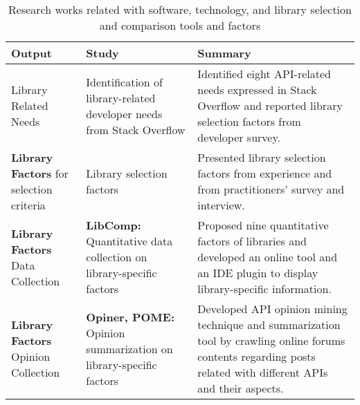 \begin{table*}[]
    \centering
    \caption{Research works related with software, technology, and library selection and comparison tools and factors} 
    \renewcommand{\arraystretch}{1.2}
    
    \begin{tabular}{>{\raggedright}p{2.6cm}p{3.9cm}p{7.6cm}}
    \toprule
    \textbf{Output} & \textbf{Study} & \textbf{Summary}  \\ 
    \midrule
    
    Library Related Needs & 
    Identification of library-related developer needs from Stack Overflow \cite{liu2021api, uddin2019understanding} 
    & Identified eight API-related needs expressed in Stack Overflow and reported library selection factors from developer survey. \\ 
    
    
    \textbf{Library Factors} for selection criteria & Library selection factors \cite{spinellis2019select, larios2020selecting} & Presented library selection factors from experience and from practitioners' survey and interview. \\ 
 
    \textbf{Library Factors} Data Collection & \textbf{LibComp:} Quantitative data collection on library-specific factors \cite{de2018library, de2018empirical, el2020libcomp} & Proposed nine quantitative factors of libraries and developed an online tool and an IDE plugin to display library-specific information. \\ 
    
    \textbf{Library Factors} Opinion Collection & \textbf{Opiner, POME:} Opinion summarization on library-specific factors \cite{uddin2017automatic, uddin2017opiner, lin2019pattern, uddin2019automatic, uddin2022empirical} & Developed API opinion mining technique and summarization tool by crawling online forums contents regarding posts related with different APIs and their aspects. \\ 


\end{tabular}
\end{table*}
